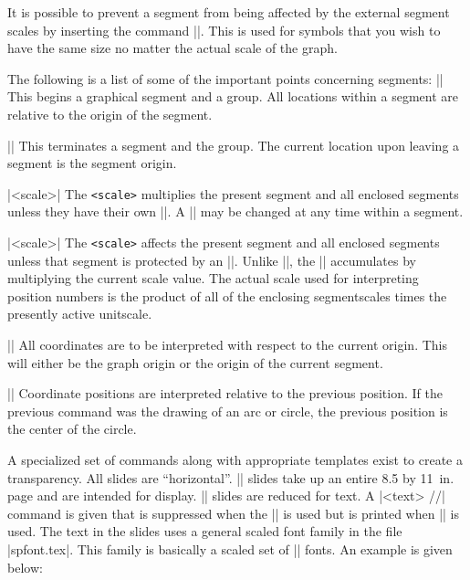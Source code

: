 It is possible to prevent a segment from being affected by the external
segment scales by inserting the command |\absolutescale|. This is used for
symbols that you wish to have the same size no matter the actual scale of the
graph. 

The following is a list of some of the important points concerning segments:
\beginblockmode
\ext\@|\beginsegment|
\nbr
This begins a graphical segment and a group. All locations within a segment
are relative to the origin of the segment. 

\mbr\ext\@|\endsegment|
\nbr
This terminates a segment and the group. The current location upon leaving
a segment is the segment origin. 

\mbr\ext\@|\unitscale <scale>|
\nbr
The {\tt <scale>} multiplies the present segment and all
enclosed segments unless they have their own |\unitscale|. A |\unitscale| may
be changed at any time within a segment. 

\mbr\ext\@|\segmentscale <scale>|
\nbr
The {\tt <scale>} affects the present segment and all
enclosed segments unless that segment is protected by an |\absolutescale|.
Unlike |\unitscale|, the |\segmentscale| accumulates by multiplying the
current scale value.
The actual scale used for interpreting position numbers is the
product of all of the enclosing segmentscales times the presently active
unitscale. 

\mbr\ext\@|\absoluteposition|
\nbr
All coordinates are to be interpreted with respect to the current origin.
This will either be the graph origin or the origin of the current segment.

\mbr\ext\@|\relativeposition|
\nbr
Coordinate positions are interpreted relative to the previous position. If
the previous command was the drawing of an arc or circle, 
the previous position is
the center of the circle. 
\endblockmode



A specialized set of commands along with appropriate templates exist to
create a transparency. All slides are ``horizontal''. |\fullform| slides
take up an entire 8.5 by 11~in. page and are intended for display.
|\textform| slides are reduced for text. A |\comment <text> //| command is
given that is suppressed when the |\fullform| is used but is printed when
|\textform| is used. The text in the slides uses a general scaled font
family in the file |spfont.tex|. This family is basically a scaled set of
|\tenpoint| fonts. An example is given below:



